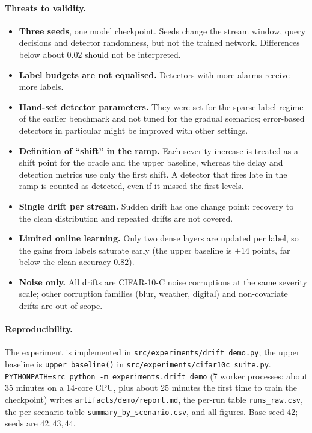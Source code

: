 \documentclass[11pt,a4paper]{article}
\begin{document}
\paragraph{Threats to validity.}
\begin{itemize}[nosep]
 \item \textbf{Three seeds}, one model checkpoint. Seeds change the stream window, query decisions and detector randomness, but not the trained network. Differences below about $0.02$ should not be interpreted.
 \item \textbf{Label budgets are not equalised.} Detectors with more alarms receive more labels.
 \item \textbf{Hand-set detector parameters.} They were set for the sparse-label regime of the earlier benchmark and not tuned for the gradual scenarios; error-based detectors in particular might be improved with other settings.
 \item \textbf{Definition of ``shift'' in the ramp.} Each severity increase is treated as a shift point for the oracle and the upper baseline, whereas the delay and detection metrics use only the first shift. A detector that fires late in the ramp is counted as detected, even if it missed the first levels.
 \item \textbf{Single drift per stream.} Sudden drift has one change point; recovery to the clean distribution and repeated drifts are not covered.
 \item \textbf{Limited online learning.} Only two dense layers are updated per label, so the gains from labels saturate early (the upper baseline is $+14$ points, far below the clean accuracy $0.82$).
 \item \textbf{Noise only.} All drifts are CIFAR-10-C noise corruptions at the same severity scale; other corruption families (blur, weather, digital) and non-covariate drifts are out of scope.
\end{itemize}

\paragraph{Reproducibility.}
The experiment is implemented in \texttt{src/experiments/drift\_demo.py}; the upper baseline is \texttt{upper\_baseline()} in \texttt{src/experiments/cifar10c\_suite.py}.
\texttt{PYTHONPATH=src python -m experiments.drift\_demo} (7 worker processes: about 35 minutes on a 14-core CPU, plus about 25 minutes the first time to train the checkpoint) writes
\texttt{artifacts/demo/report.md}, the per-run table \texttt{runs\_raw.csv}, the per-scenario table \texttt{summary\_by\_scenario.csv}, and all figures.
Base seed 42; seeds are $42, 43, 44$.
\end{document}
